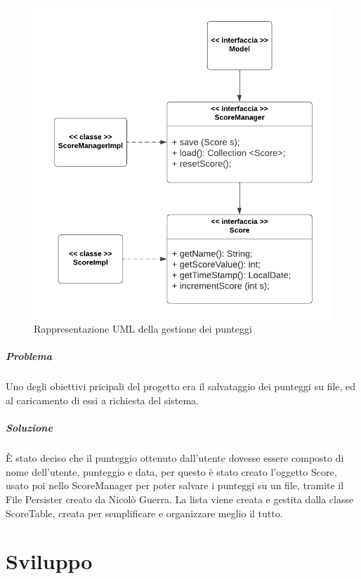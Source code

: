 \documentclass[a4paper,12pt]{report}
\begin{document}
\begin{figure}[H]
	\centering{}
	\includegraphics[width=\textwidth]{img/score.pdf}
	\caption{Rappresentazione UML della gestione dei punteggi}
\end{figure}

\paragraph{Problema} Uno degli obiettivi pricipali del progetto era il salvataggio dei punteggi su file, ed al caricamento di essi a richiesta del sistema.

\paragraph{Soluzione} È stato deciso che il punteggio ottenuto dall'utente dovesse essere composto di nome dell'utente, punteggio e data, per questo è stato creato
l'oggetto Score, usato poi nello ScoreManager per poter salvare i punteggi su un file, tramite il File Persister creato da Nicolò Guerra.
La lista viene creata e gestita dalla classe ScoreTable, creata per semplificare e organizzare meglio il tutto.

\chapter{Sviluppo}
\end{document}
